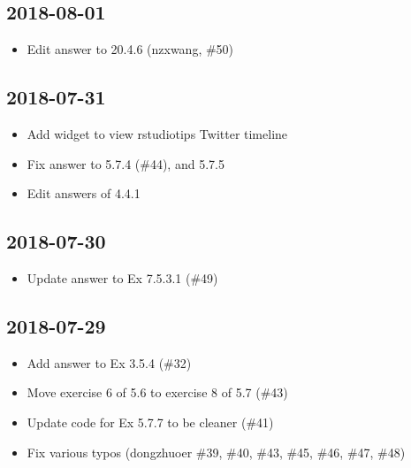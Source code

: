 \documentclass[]{book}
\providecommand{\tightlist}{%
  \setlength{\itemsep}{0pt}\setlength{\parskip}{0pt}}
\theoremstyle{plain}
\theoremstyle{remark}
\theoremstyle{definition}
\theoremstyle{definition}
\theoremstyle{definition}
\theoremstyle{remark}
\begin{document}
\hypertarget{section-4}{%
\subsection*{2018-08-01}\label{section-4}}

\begin{itemize}
\tightlist
\item
  Edit answer to 20.4.6 (nzxwang, \#50)
\end{itemize}

\hypertarget{section-5}{%
\subsection*{2018-07-31}\label{section-5}}

\begin{itemize}
\tightlist
\item
  Add widget to view rstudiotips Twitter timeline
\item
  Fix answer to 5.7.4 (\#44), and 5.7.5
\item
  Edit answers of 4.4.1
\end{itemize}

\hypertarget{section-6}{%
\subsection*{2018-07-30}\label{section-6}}

\begin{itemize}
\tightlist
\item
  Update answer to Ex 7.5.3.1 (\#49)
\end{itemize}

\hypertarget{section-7}{%
\subsection*{2018-07-29}\label{section-7}}

\begin{itemize}
\tightlist
\item
  Add answer to Ex 3.5.4 (\#32)
\item
  Move exercise 6 of 5.6 to exercise 8 of 5.7 (\#43)
\item
  Update code for Ex 5.7.7 to be cleaner (\#41)
\item
  Fix various typos (dongzhuoer \#39, \#40, \#43, \#45, \#46, \#47,
  \#48)
\end{itemize}
\end{document}
